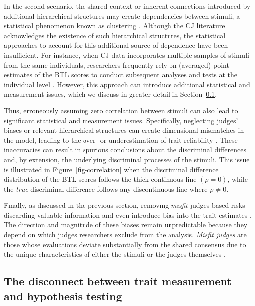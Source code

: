 \documentclass[
  authoryear,
  review,
  1p]{elsarticle}
\begin{document}
In the second scenario, the shared context or inherent connections
introduced by additional hierarchical structures may create dependencies
between stimuli, a statistical phenomenon known as clustering
\citep{Everitt_et_al_2010}. Although the CJ literature acknowledges the
existence of such hierarchical structures, the statistical approaches to
account for this additional source of dependence have been insufficient.
For instance, when CJ data incorporates multiple samples of stimuli from
the same individuals, researchers frequently rely on (averaged) point
estimates of the BTL scores to conduct subsequent analyses and tests at
the individual level
\citep{Bramley_et_al_2019, Boonen_et_al_2020, Bouwer_et_al_2023, vanDaal_et_al_2017, Jones_et_al_2019, Gijsen_et_al_2021}.
However, this approach can introduce additional statistical and
measurement issues, which we discuss in greater detail in
Section~\ref{sec-theory-issue2}.

Thus, erroneously assuming zero correlation between stimuli can also
lead to significant statistical and measurement issues. Specifically,
neglecting judges' biases or relevant hierarchical structures can create
dimensional mismatches in the model, leading to the over- or
underestimation of trait reliability \citep[pp.~341,
482]{Ackerman_1989, Hoyle_et_al_2023}. These inaccuracies can result in
spurious conclusions about the discriminal differences
\citep[pp.~370]{McElreath_2020} and, by extension, the underlying
discriminal processes of the stimuli. This issue is illustrated in
Figure~\ref{fig-correlation} when the discriminal difference
distribution of the BTL scores follows the thick continuous line
\((\rho = 0)\), while the \emph{true} discriminal difference follows any
discontinuous line where \(\rho \neq 0\).

Finally, as discussed in the previous section, removing \emph{misfit}
judges based risks discarding valuable information and even introduce
bias into the trait estimates
\citep[chap.~12]{Zimmerman_1994, McElreath_2020}. The direction and
magnitude of these biases remain unpredictable because they depend on
which judges researchers exclude from the analysis. \emph{Misfit judges}
are those whose evaluations deviate substantially from the shared
consensus due to the unique characteristics of either the stimuli or the
judges themselves
\citetext{\citealp[pp.~164-165]{Pollitt_2012a}; \citealp[pp.~289-290]{Pollitt_2012b}; \citealp[pp.~4]{vanDaal_et_al_2016}; \citealp[pp.~20]{Goossens_et_al_2018}}.

\subsection{The disconnect between trait measurement and hypothesis
testing}\label{sec-theory-issue2}
\end{document}
